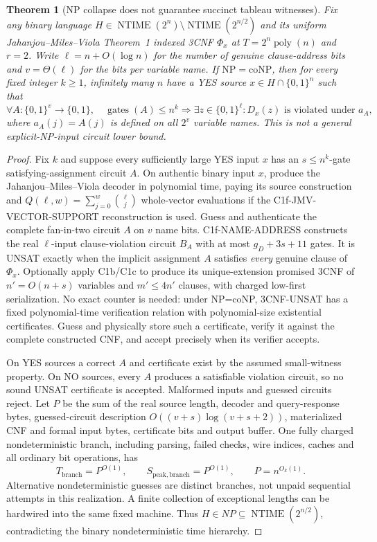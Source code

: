\documentclass[11pt]{article}
\newtheorem{theorem}{Theorem}
\begin{document}
\begin{theorem}[NP collapse does not guarantee succinct tableau witnesses]
Fix any binary language
$H\in\operatorname{NTIME}(2^n)\setminus
\operatorname{NTIME}(2^{n/2})$ and its uniform Jahanjou--Miles--Viola
Theorem~1 indexed 3CNF $\Phi_x$ at $T=2^n\operatorname{poly}(n)$
and $r=2$. Write $\ell=n+O(\log n)$ for the number of genuine
clause-address bits and $v=\Theta(\ell)$ for the bits per
variable name. If $\mathrm{NP}=\mathrm{coNP}$, then for every
fixed integer $k\ge1$, infinitely many $n$ have a YES source
$x\in H\cap\{0,1\}^n$ such that
\[
\forall A:\{0,1\}^{v}\to\{0,1\},\quad
\operatorname{gates}(A)\le n^k
\Longrightarrow
\exists z\in\{0,1\}^{\ell}:
D_x(z)\text{ is violated under }a_A,
\]
where $a_A(j)=A(j)$ is defined on all $2^v$ variable names.
This is not a general explicit-NP-input circuit lower bound.
\end{theorem}
\begin{proof}
Fix $k$ and suppose every sufficiently large YES input $x$
has an $s\le n^k$-gate satisfying-assignment circuit $A$.
On authentic binary input $x$, produce the Jahanjou--Miles--Viola
decoder in polynomial time, paying its source construction and
$Q(\ell,w)=\sum_{j=0}^{w}\binom{\ell}{j}$ whole-vector evaluations
if the C1f-JMV-VECTOR-SUPPORT reconstruction is used. Guess and
authenticate the complete fan-in-two circuit $A$ on $v$ name bits.
C1f-NAME-ADDRESS constructs the real $\ell$-input
clause-violation circuit $B_A$ with at most $g_D+3s+11$
gates. It is UNSAT exactly when the implicit assignment
$A$ satisfies \emph{every} genuine clause of $\Phi_x$.
Optionally apply C1b/C1c to produce its unique-extension
promised 3CNF of $n'=O(n+s)$ variables and
$m'\le4n'$ clauses, with charged low-first serialization.
No exact counter is needed: under NP=coNP,
3CNF-UNSAT has a fixed polynomial-time verification
relation with polynomial-size existential certificates.
Guess and physically store such a certificate, verify it
against the complete constructed CNF, and accept precisely
when its verifier accepts.

On YES sources a correct $A$ and certificate exist
by the assumed small-witness property. On NO sources,
every $A$ produces a satisfiable violation circuit,
so no sound UNSAT certificate is accepted. Malformed
inputs and guessed circuits reject.
Let $P$ be the sum of the real source length, decoder
and query-response bytes, guessed-circuit description
$O((v+s)\log(v+s+2))$, materialized CNF and formal
input bytes, certificate bits and output buffer.
One fully charged nondeterministic branch, including
parsing, failed checks, wire indices, caches and all
ordinary bit operations, has
\[
T_{\mathrm{branch}}=P^{O(1)},\qquad
S_{\mathrm{peak,branch}}=P^{O(1)},
\qquad P=n^{O_k(1)}.
\]
Alternative nondeterministic guesses are distinct
branches, not unpaid sequential attempts in this
realization. A finite collection of exceptional lengths
can be hardwired into the same fixed machine. Thus
$H\in NP\subseteq\operatorname{NTIME}(2^{n/2})$,
contradicting the binary nondeterministic time hierarchy.
\end{proof}
\end{document}
